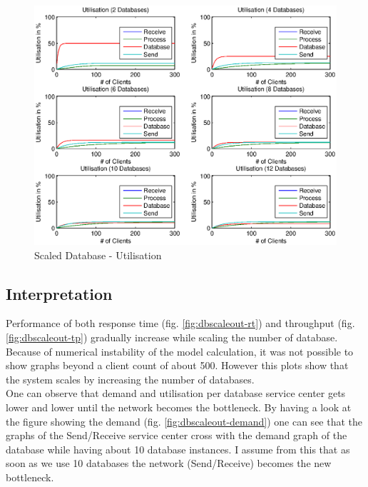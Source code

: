 \documentclass[a4paper]{article}
\begin{document}


\begin{figure}[H]
	\begin{center}
    \includegraphics[scale=0.8]{../plots-ms2-mg/dbscaleout-utilisation-0.eps}
  \end{center}
  \caption{Scaled Database - Utilisation}
  \label{fig:dbscaleout-utilisation}
\end{figure}


\subsection{Interpretation}
Performance of both response time (fig. \ref{fig:dbscaleout-rt}) and throughput (fig. \ref{fig:dbscaleout-tp}) gradually increase while scaling the number of database. Because of numerical instability of the model calculation, it was not possible to show graphs beyond a client count of about 500. However this plots show that the system scales by increasing the number of databases.\\

One can observe that demand and utilisation per database service center gets lower and lower until the network becomes the bottleneck. By having a look at the figure showing the demand (fig. \ref{fig:dbscaleout-demand}) one can see that the graphs of the Send/Receive service center cross with the demand graph of the database while having about 10 database instances. I assume from this that as soon as we use 10 databases the network (Send/Receive) becomes the new bottleneck.
\end{document}
